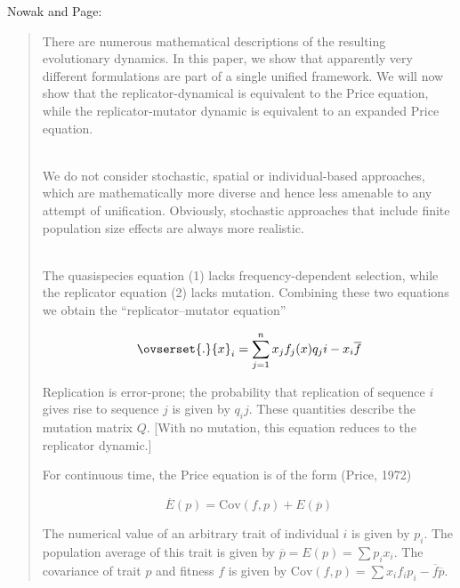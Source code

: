\documentclass[a4paper,10pt]{article}
\begin{document}
Nowak and Page:
\begin{quotation}
\cite{page2002-unifyingEvolutionaryDynamics}
    There are numerous mathematical descriptions of the resulting evolutionary dynamics.
    In this paper, we show that apparently very different formulations are part of a single unified framework.
    We will now show that the replicator-dynamical is equivalent to the Price equation, while the replicator-mutator dynamic is equivalent to an expanded Price equation.
    
    \\
    
    We do not consider stochastic, spatial or individual-based approaches, which are mathematically more diverse and hence less amenable to any attempt of unification.
    Obviously, stochastic approaches that include finite population size effects are always more realistic.
    
    \\
    
    The quasispecies equation (1) lacks frequency-dependent selection, while the replicator equation (2) lacks mutation.
    Combining these two equations we obtain the ``replicator–mutator equation''
    
    \begin{equation}
        \ovserset{.}{x}_i = \sum^n_{j=1} x_j f_j(x) q_ji - x_i \overline{f}  
    \end{equation}
    
    Replication is error-prone; the probability that replication of sequence $i$ gives rise to sequence $j$ is given by $q_ij$.
    These quantities describe the mutation matrix $Q$.
    [With no mutation, this equation reduces to the replicator dynamic.]
    
    For continuous time, the Price equation is of the form (Price, 1972)
    
    \begin{equation}
    \overset{.}{E}(p) = \text{Cov}(f,p) + E(\overset{.}{p})
    \end{equation}
    
    The numerical value of an arbitrary trait of individual $i$ is given by $p_i$. The population average of this trait is given by $\overline{p} = E(p) = \sum p_i x_i$.
    The covariance of trait $p$ and fitness $f$ is given by $\text{Cov}(f,p)=\sum x_i f_i p_i - \overline{f}\overline{p}$.
    
\end{quotation}



{\footnotesize


}
\end{document}
